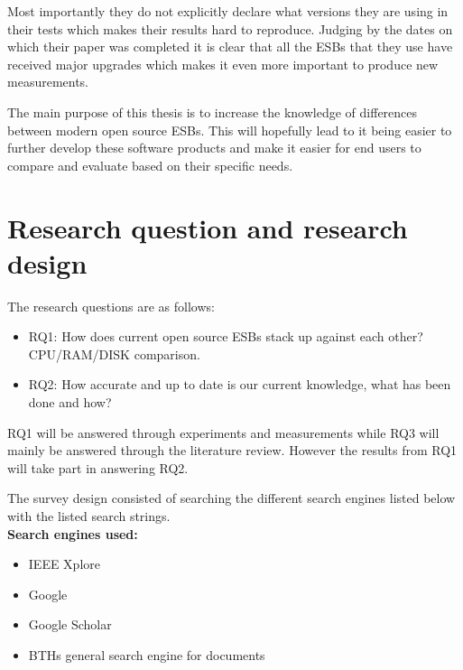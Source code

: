 \documentclass{llncs}
\begin{document}
Most importantly they do not explicitly declare what versions they are using in their tests which makes their results hard to reproduce. 
Judging by the dates on which their paper was completed it is clear that all the ESBs that they use have received major upgrades which makes it even more important to produce new measurements.

The main purpose of this thesis is to increase the knowledge of differences between modern open source ESBs. 
This will hopefully lead to it being easier to further develop these software products and make it easier for end users to compare and evaluate based on their specific needs.


\section{Research question and research design}
The research questions are as follows:
\begin{itemize}
	\item RQ1: How does current open source ESBs stack up against each other? CPU/RAM/DISK comparison.
	\item RQ2: How accurate and up to date is our current knowledge, what has been done and how?
\end{itemize}
RQ1 will be answered through experiments and measurements while RQ3 will mainly be answered through the literature review. However the results from RQ1 will take part in answering RQ2.

The survey design consisted of searching the different search engines listed below with the listed search strings. \\

{\bf Search engines used:}
\begin{itemize}
	\item IEEE Xplore
	\item Google
	\item Google Scholar
	\item BTHs general search engine for documents
\end{itemize}
\end{document}
